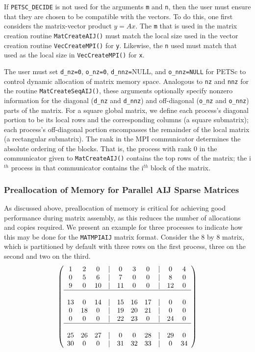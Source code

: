 If \lstinline{PETSC_DECIDE} is not used for the arguments
\lstinline{m} and \lstinline{n}, then the user must ensure that they are chosen to be
compatible with the vectors. To do this, one first considers the matrix-vector product
$y = A x$. The \lstinline{m} that is used in the matrix creation routine \lstinline{MatCreateAIJ()}
must match the local size used in the vector creation routine \lstinline{VecCreateMPI()} for \lstinline{y}.
Likewise, the \lstinline{n} used must match that used as the local size in
\lstinline{VecCreateMPI()} for \lstinline{x}.

The user must set \lstinline{d_nz=0}, \lstinline{o_nz=0}, \lstinline{d_nnz=}NULL, and
\lstinline{o_nnz=NULL} for PETSc to control dynamic allocation of matrix
memory space.  Analogous to \lstinline{nz} and \lstinline{nnz} for the routine
\break\lstinline{MatCreateSeqAIJ()}, these arguments optionally specify
nonzero information for the diagonal (\lstinline{d_nz} and \lstinline{d_nnz}) and
off-diagonal (\lstinline{o_nz} and \lstinline{o_nnz}) parts of the matrix.
For a square global matrix, we define each process's diagonal portion
to be its local rows and the corresponding columns (a square submatrix);
each process's off-diagonal portion encompasses the remainder of the
local matrix (a rectangular submatrix).
The rank in the MPI communicator determines the absolute ordering of the
blocks.  That is, the process with rank 0 in the communicator given to  \lstinline{MatCreateAIJ()} contains the top rows of the matrix; the i$^{th}$ process
in that communicator contains the i$^{th}$ block of the matrix.

\subsubsection{Preallocation of Memory for Parallel AIJ Sparse Matrices}

As discussed above, preallocation of memory is critical for achieving good
performance during matrix assembly, as this reduces the number of
allocations and copies required.  We present an example for
three processes to indicate how this may be done for the \lstinline{MATMPIAIJ}
matrix format.  Consider the 8 by
8 matrix, which is partitioned by default with three rows on the first
process, three on the second and two on the third.  {\small
\[
\left( \begin{array}{cccccccccc}
1  & 2  & 0  & | & 0  & 3  & 0  & |  & 0  & 4  \\
0  & 5  & 6  & | & 7  & 0  & 0  & |  & 8  & 0 \\
9  & 0  & 10 & | & 11 & 0  & 0  & |  & 12 & 0  \\
\hline \\
13 & 0  & 14 & | & 15 & 16 & 17 & |  & 0  & 0  \\
0  & 18 & 0  & | & 19 & 20 & 21 & |  & 0  & 0 \\
0  & 0  & 0  & | & 22 & 23 & 0  & |  & 24 & 0 \\
\hline \\
25 & 26 & 27 & | & 0  & 0  & 28 & |  & 29 & 0 \\
30 & 0  & 0  & | & 31 & 32 & 33 & |  & 0  &34
\end{array} \right)
\]
}

